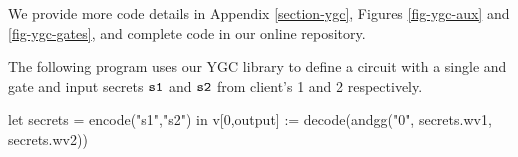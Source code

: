We provide more code details in Appendix \ref{section-ygc}, Figures
\ref{fig-ygc-aux} and \ref{fig-ygc-gates}, and complete code in our
online repository.
\begin{example}
  \label{example-ygc-andcircuit}
The following program uses our YGC library to define
a circuit with a single and gate and input secrets $\texttt{s1}$ and
$\texttt{s2}$ from client's 1 and 2 respectively. 
{\small
\begin{verbatimtab}
  let secrets = encode("s1","s2") in
  v[0,output] := decode(andgg("0", secrets.wv1, secrets.wv2)) \end{verbatimtab}
}
\end{example}
